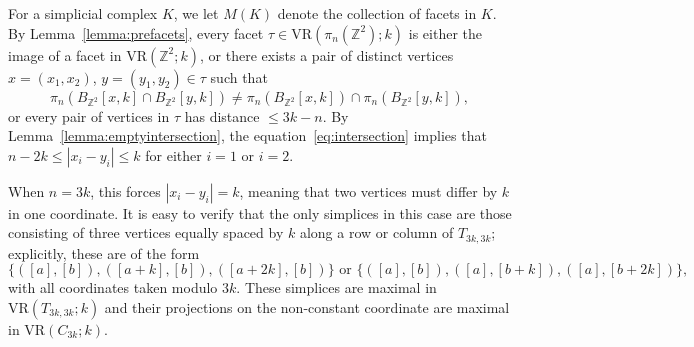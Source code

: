 \documentclass[12pt,a4paper]{amsart}
\theoremstyle{definition}
\newcommand{\Z}{\ensuremath{\mathbb{Z}}}
\newcommand{\vr}[2]{\mathrm{VR}(#1;#2)}
\numberwithin{equation}{section}
\begin{document}
%    




For a simplicial complex $K$, we let $M(K)$ denote the collection of facets in $K$.
By Lemma~\ref{lemma:prefacets}, every facet $\tau\in\vr{\pi_n(\Z^2)}{k}$ is either the image of a facet in $\vr{\Z^2}{k}$, or there exists a pair of distinct vertices $x=(x_1,x_2)$, $y=(y_1,y_2)\in\tau$ such that
\begin{equation}
\label{eq:intersection}
\pi_n(B_{\Z^2}[x, k]\cap B_{\Z^2}[y, k]) \neq \pi_n(B_{\Z^2}[x, k])\cap \pi_n(B_{\Z^2}[y, k]),
\end{equation}
or every pair of vertices in $\tau$ has distance $\leq 3k-n$.
By Lemma~\ref{lemma:emptyintersection}, the equation~\eqref{eq:intersection} implies that $n-2k\leq |x_i-y_i|\leq k$ for either $i=1$ or $i=2$.

When $n=3k$, this forces $|x_i-y_i|=k$, meaning that two vertices must differ by $k$ in one coordinate.
It is easy to verify that the only simplices in this case are those consisting of three vertices equally spaced by $k$ along a row or column of $T_{3k,3k}$; explicitly, these are of the form 
\[\{([a], [b]), ([a+k], [b]), ([a+2k], [b])\}\text{ or }\{([a], [b]), ([a], [b+k]), ([a], [b+2k])\},\]
with all coordinates taken modulo $3k$.
These simplices are maximal in $\vr{T_{3k,3k}}{k}$ and their projections on the non-constant coordinate are maximal in $\vr{C_{3k}}{k}$.
\end{document}
